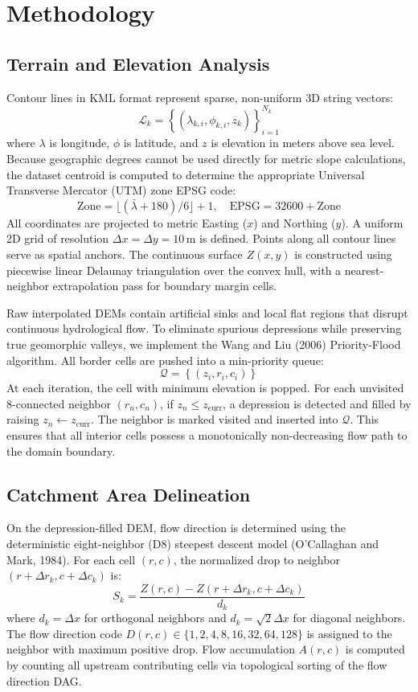 \documentclass[manuscript,screen,review]{acmart}
\begin{document}
\section{Methodology}
\label{sec:methodology}

\subsection{Terrain and Elevation Analysis}
Contour lines in KML format represent sparse, non-uniform 3D string vectors:
$$\mathcal{L}_k = \left\{ (\lambda_{k,i}, \phi_{k,i}, z_k) \right\}_{i=1}^{N_k}$$
where $\lambda$ is longitude, $\phi$ is latitude, and $z$ is elevation in meters above sea level. Because geographic degrees cannot be used directly for metric slope calculations, the dataset centroid is computed to determine the appropriate Universal Transverse Mercator (UTM) zone EPSG code:
$$\text{Zone} = \lfloor (\bar{\lambda} + 180) / 6 \rfloor + 1, \quad \text{EPSG} = 32600 + \text{Zone}$$
All coordinates are projected to metric Easting ($x$) and Northing ($y$). A uniform 2D grid of resolution $\Delta x = \Delta y = 10\,\text{m}$ is defined. Points along all contour lines serve as spatial anchors. The continuous surface $Z(x, y)$ is constructed using piecewise linear Delaunay triangulation over the convex hull, with a nearest-neighbor extrapolation pass for boundary margin cells.

Raw interpolated DEMs contain artificial sinks and local flat regions that disrupt continuous hydrological flow. To eliminate spurious depressions while preserving true geomorphic valleys, we implement the Wang and Liu (2006) Priority-Flood algorithm. All border cells are pushed into a min-priority queue:
$$\mathcal{Q} = \left\{ (z_i, r_i, c_i) \right\}$$
At each iteration, the cell with minimum elevation is popped. For each unvisited 8-connected neighbor $(r_n, c_n)$, if $z_n \le z_{\text{curr}}$, a depression is detected and filled by raising $z_n \leftarrow z_{\text{curr}}$. The neighbor is marked visited and inserted into $\mathcal{Q}$. This ensures that all interior cells possess a monotonically non-decreasing flow path to the domain boundary.

\subsection{Catchment Area Delineation}
On the depression-filled DEM, flow direction is determined using the deterministic eight-neighbor (D8) steepest descent model (O'Callaghan and Mark, 1984). For each cell $(r, c)$, the normalized drop to neighbor $(r + \Delta r_k, c + \Delta c_k)$ is:
$$S_k = \frac{Z(r, c) - Z(r + \Delta r_k, c + \Delta c_k)}{d_k}$$
where $d_k = \Delta x$ for orthogonal neighbors and $d_k = \sqrt{2}\Delta x$ for diagonal neighbors. The flow direction code $D(r, c) \in \{1, 2, 4, 8, 16, 32, 64, 128\}$ is assigned to the neighbor with maximum positive drop. Flow accumulation $A(r, c)$ is computed by counting all upstream contributing cells via topological sorting of the flow direction DAG.
\end{document}
